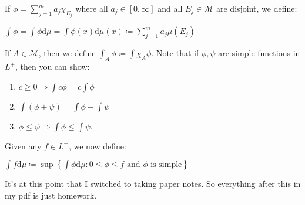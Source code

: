 \documentclass{book}
\newcommand{\hTwo}{%
\color{MidnightBlue}%
   \fontsize{13}{15}\selectfont%
}
\newcommand{\myComment}{%
   \color{RawerSienna}%
   \fontsize{12}{14}\selectfont%
}
\newcommand{\df}{\mathrm{d}}
\newcommand{\retTwo}{\hfill\bigbreak}
\begin{document}
If $\phi = \sum_{j=1}^m a_j\chi_{E_j}$ where all $a_j \in [0, \infty]$ and all $E_j \in \mathcal{M}$ are disjoint, we define:

{\centering $\int \phi = \int \phi \df \mu = \int \phi(x) \df \mu(x) \coloneq \sum\limits_{j=1}^m a_j \mu(E_j)$ \newpage\par}

If $A \in \mathcal{M}$, then we define $\int_A \phi \coloneq \int \chi_A \phi$. Note that if $\phi, \psi$ are simple functions in $L^+$, then you can show:

\begin{enumerate}\hTwo
	\item $c \geq 0 \Longrightarrow \int c \phi = c \int \phi$
\item $\int(\phi + \psi) = \int \phi + \int \psi$
\item $\phi \leq \psi \Longrightarrow \int \phi \leq \int \psi$.
\end{enumerate}

Given any $f \in L^+$, we now define:

{\centering$\int f \df \mu \coloneq \sup \left\{\int \phi \df \mu : 0 \leq \phi \leq f \text{ and } \phi \text{ is simple}\right\}$\retTwo\par}
\retTwo
\retTwo

\myComment It's at this point that I switched to taking paper notes. So everything after this in my pdf is just homework.


\newpage






















\end{document}
